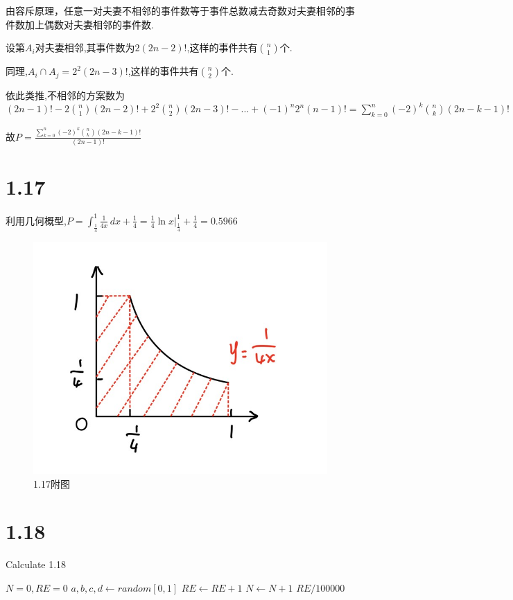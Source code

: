 \documentclass[12pt,a4paper]{ctexart}
\begin{document}
由容斥原理，任意一对夫妻不相邻的事件数等于事件总数减去奇数对夫妻相邻的事件数加上偶数对夫妻相邻的事件数.

设第$A_i$对夫妻相邻,其事件数为$2(2n-2)!$,这样的事件共有$\binom{n}{1}$个.

同理,$A_i\cap A_j=2^2(2n-3)!$,这样的事件共有$\binom{n}{2}$个.

依此类推,不相邻的方案数为$(2n-1)!-2\binom{n}{1}(2n-2)!+2^2\binom{n}{2}(2n-3)!-...+(-1)^n2^n(n-1)! =\sum_{k=0}^n(-2)^k\binom{n}{k}(2n-k-1)!$

故$P=\frac{\sum_{k=0}^n(-2)^k\binom{n}{k}(2n-k-1)!}{(2n-1)!}$

\section{1.17}
利用几何概型,$P=\int_{\frac{1}{4}}^{1}\frac{1}{4x} \,dx +\frac{1}{4}=\frac{1}{4}\ln x|_{\frac{1}{4}}^1 +\frac{1}{4}=0.5966$
\begin{figure}[H]
	\centering
	\includegraphics[width=0.7\linewidth]{几何概型.jpg}
	\caption{1.17附图}
\end{figure}
\section{1.18}
\begin{algorithm}
	\renewcommand{\algorithmicrequire}{\textbf{Input:}}
	\renewcommand{\algorithmicensure}{\textbf{Output:}}
	\caption{Calculate 1.18}
	\label{alg1}
	\begin{algorithmic}
		\STATE $N=0,RE=0$
		\STATE $a,b,c,d \gets random[0,1]$
		\STATE $RE\gets RE+1$
		\ENDIF
		\STATE $N\gets N+1$
		\ENDWHILE
		\ENSURE $RE/100000$
	\end{algorithmic}
\end{algorithm}
\end{document}
